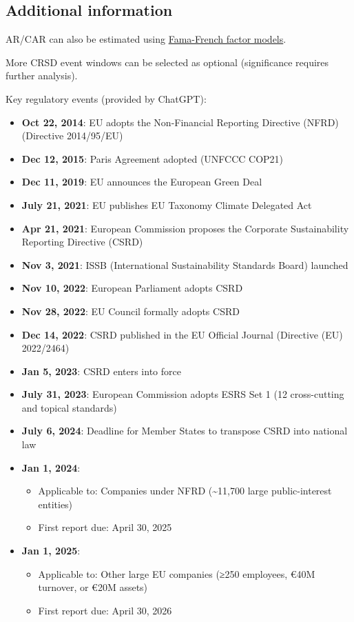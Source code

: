 \documentclass[
  letterpaper,
  DIV=11,
  numbers=noendperiod]{scrartcl}
\providecommand{\tightlist}{%
  \setlength{\itemsep}{0pt}\setlength{\parskip}{0pt}}
\begin{document}
\subsection{Additional information}\label{additional-information}

AR/CAR can also be estimated using
\href{https://mba.tuck.dartmouth.edu/pages/faculty/ken.french/data_library.html}{Fama-French
factor models}.

More CRSD event windows can be selected as optional (significance
requires further analysis).

Key regulatory events (provided by ChatGPT):

\begin{itemize}
\item
  \textbf{Oct 22, 2014}: EU adopts the Non-Financial Reporting Directive
  (NFRD) (Directive 2014/95/EU)
\item
  \textbf{Dec 12, 2015}: Paris Agreement adopted (UNFCCC COP21)
\item
  \textbf{Dec 11, 2019}: EU announces the European Green Deal
\item
  \textbf{July 21, 2021}: EU publishes EU Taxonomy Climate Delegated Act
\item
  \textbf{Apr 21, 2021}: European Commission proposes the Corporate
  Sustainability Reporting Directive (CSRD)
\item
  \textbf{Nov 3, 2021}: ISSB (International Sustainability Standards
  Board) launched
\item
  \textbf{Nov 10, 2022}: European Parliament adopts CSRD
\item
  \textbf{Nov 28, 2022}: EU Council formally adopts CSRD
\item
  \textbf{Dec 14, 2022}: CSRD published in the EU Official Journal
  (Directive (EU) 2022/2464)
\item
  \textbf{Jan 5, 2023}: CSRD enters into force
\item
  \textbf{July 31, 2023}: European Commission adopts ESRS Set 1 (12
  cross-cutting and topical standards)
\item
  \textbf{July 6, 2024}: Deadline for Member States to transpose CSRD
  into national law
\item
  \textbf{Jan 1, 2024}:

  \begin{itemize}
  \tightlist
  \item
    Applicable to: Companies under NFRD (\textasciitilde11,700 large
    public-interest entities)\\
  \item
    First report due: April 30, 2025
  \end{itemize}
\item
  \textbf{Jan 1, 2025}:

  \begin{itemize}
  \tightlist
  \item
    Applicable to: Other large EU companies (≥250 employees, €40M
    turnover, or €20M assets)\\
  \item
    First report due: April 30, 2026
  \end{itemize}
\end{itemize}
\end{document}
